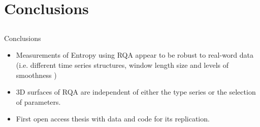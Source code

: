 \section{Conclusions}

\subsection{}
{
\begin{frame}{Conclusions}

\begin{itemize}
	\item Measurements of Entropy using RQA appear
	to be robust to real-word data (i.e. different time series
	structures, window length size and levels of smoothness )
	\item 3D surfaces of RQA are independent of either
	the type series or the selection of parameters.
	\item First open access thesis with data and code 
	for its replication. 
\end{itemize}

\end{frame}
}

%
%
%
%
%
%


